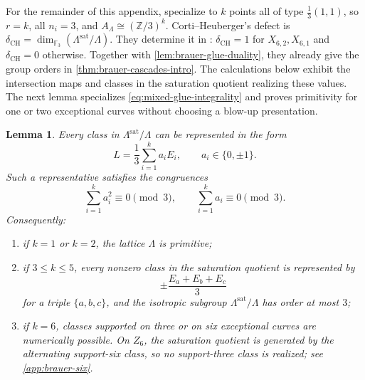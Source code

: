 \documentclass[11pt]{article}
\theoremstyle{plain}
\newtheorem{lemma}[lemma]{Lemma}
\theoremstyle{definition}
\theoremstyle{remark}
\newcommand{\Z}{\mathbb Z}
\begin{document}
For the remainder of this appendix, specialize to \(k\) points all
of type \(\frac13(1,1)\), so \(r=k\), all \(n_i=3\), and
\(A_\Lambda\cong(\Z/3)^k\). Corti--Heuberger's defect is
\(\delta_{\mathrm{CH}}=\dim_{\mathbb F_3}(\Lambda^{\mathrm{sat}}/\Lambda)\).
They determine it in \cite[Section~2.1, Proposition~18(b), and
Lemma~28]{Corti2016}: \(\delta_{\mathrm{CH}}=1\) for \(X_{6,2},X_{6,1}\)
and \(\delta_{\mathrm{CH}}=0\) otherwise. Together with
\cref{lem:brauer-glue-duality}, they already give the group orders
in \cref{thm:brauer-cascades-intro}. The calculations below exhibit
the intersection maps and classes in the saturation quotient realizing these values.
The next lemma specializes \eqref{eq:mixed-glue-integrality} and
proves primitivity for one or two exceptional curves without choosing a blow-up presentation.

\begin{lemma}\label{lem:brauer-glue-vectors}
Every class in
\(\Lambda^{\mathrm{sat}}/\Lambda\) can be represented in the form
\[
L=\frac13\sum_{i=1}^k a_iE_i,
\qquad
a_i\in\{0,\pm1\}.
\]
Such a representative satisfies the congruences
\[
\sum_{i=1}^k a_i^2\equiv0\pmod3,
\qquad
\sum_{i=1}^k a_i\equiv0\pmod3.
\]
Consequently:
\begin{enumerate}[label=\textup{(\roman*)}]
\item if \(k=1\) or \(k=2\), the lattice \(\Lambda\) is primitive;
\item if \(3\leq k\leq5\), every nonzero class in the saturation quotient is represented by
\[
\pm\frac{E_a+E_b+E_c}{3}
\]
for a triple \(\{a,b,c\}\), and the isotropic subgroup
\(\Lambda^{\mathrm{sat}}/\Lambda\) has order at most \(3\);
\item if \(k=6\), classes supported on three or on six exceptional curves are
numerically possible. On \(Z_6\), the saturation quotient is generated by the
alternating support-six class, so no support-three class is realized; see
\cref{app:brauer-six}.
\end{enumerate}
\end{lemma}
\end{document}
